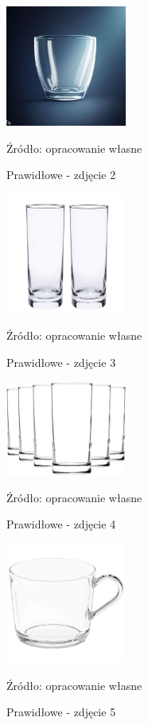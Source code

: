 \begin{figure}[htbp]
  \centering
  \caption{Prawidłowe - zdjęcie 2}
  \includegraphics[width=150px]{images/success_2.png}
  \begin{center}
  \footnotesize{Źródło: opracowanie własne}
  \end{center}
  \label{fig:zdjecie_poprawne_2}
\end{figure}

\begin{figure}[htbp]
  \centering
  \caption{Prawidłowe - zdjęcie 3}
  \includegraphics[width=150px]{images/success_3.png}
  \begin{center}
  \footnotesize{Źródło: opracowanie własne}
  \end{center}
  \label{fig:zdjecie_poprawne_1}
\end{figure}

\begin{figure}[htbp]
  \centering
  \caption{Prawidłowe - zdjęcie 4}
  \includegraphics[width=150px]{images/success_4.png}
  \begin{center}
  \footnotesize{Źródło: opracowanie własne}
  \end{center}
  \label{fig:zdjecie_poprawne_4}
\end{figure}

\begin{figure}[htbp]
  \centering
  \caption{Prawidłowe - zdjęcie 5}
  \includegraphics[width=150px]{images/success_5.png}
  \begin{center}
  \footnotesize{Źródło: opracowanie własne}
  \end{center}
  \label{fig:zdjecie_poprawne_5}
\end{figure}


